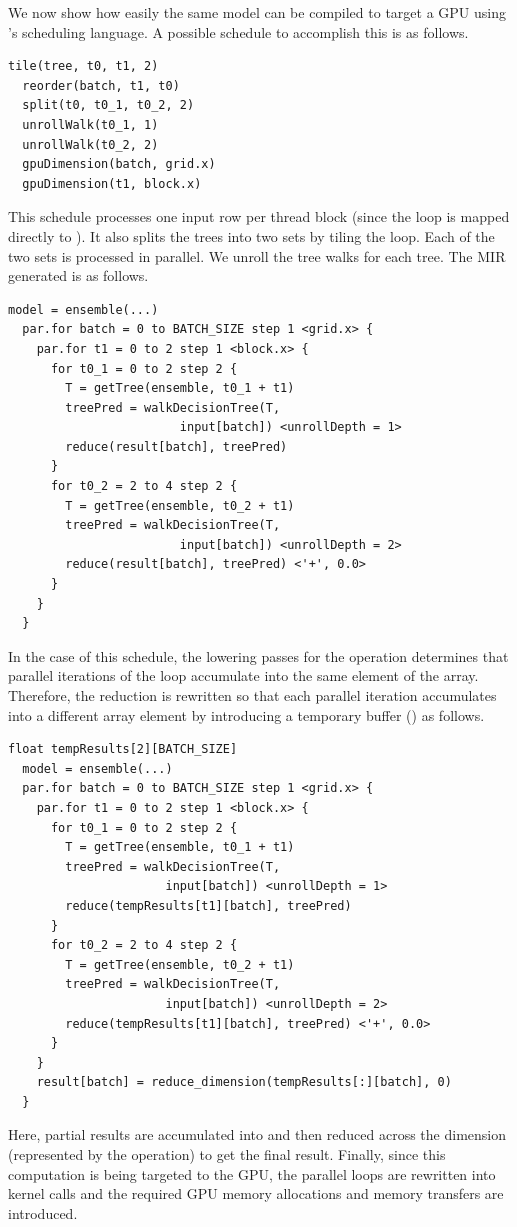 We now show how easily the same model can be compiled to target a GPU 
using \Treebeard{}'s scheduling language. 
A possible schedule to accomplish this is as follows.
\begin{lstlisting}[style=c++]
  tile(tree, t0, t1, 2)
  reorder(batch, t1, t0)
  split(t0, t0_1, t0_2, 2)
  unrollWalk(t0_1, 1)
  unrollWalk(t0_2, 2)
  gpuDimension(batch, grid.x)
  gpuDimension(t1, block.x)
\end{lstlisting}
This schedule processes one input row per thread block (since the 
loop is mapped directly to ).
It also splits the trees into two sets by tiling the  loop.
Each of the two sets is processed in parallel. We unroll the tree walks 
for each tree. The MIR generated is as follows. 
\begin{lstlisting}[style=c++]
  model = ensemble(...)
  par.for batch = 0 to BATCH_SIZE step 1 <grid.x> {
    par.for t1 = 0 to 2 step 1 <block.x> {
      for t0_1 = 0 to 2 step 2 {
        T = getTree(ensemble, t0_1 + t1)
        treePred = walkDecisionTree(T, 
                        input[batch]) <unrollDepth = 1>
        reduce(result[batch], treePred)
      }
      for t0_2 = 2 to 4 step 2 {
        T = getTree(ensemble, t0_2 + t1)
        treePred = walkDecisionTree(T,
                        input[batch]) <unrollDepth = 2>
        reduce(result[batch], treePred) <'+', 0.0>
      }
    }
  }
\end{lstlisting}

In the case of this schedule, the lowering passes for the 
operation determines that parallel iterations of the  
loop accumulate into the same element of the  array.
Therefore, the reduction is rewritten so that each parallel 
iteration accumulates into a different array element by introducing 
a temporary buffer () as follows.
\begin{lstlisting}[style=c++]
  float tempResults[2][BATCH_SIZE]
  model = ensemble(...)
  par.for batch = 0 to BATCH_SIZE step 1 <grid.x> {
    par.for t1 = 0 to 2 step 1 <block.x> {
      for t0_1 = 0 to 2 step 2 {
        T = getTree(ensemble, t0_1 + t1)
        treePred = walkDecisionTree(T, 
                      input[batch]) <unrollDepth = 1>
        reduce(tempResults[t1][batch], treePred)
      }
      for t0_2 = 2 to 4 step 2 {
        T = getTree(ensemble, t0_2 + t1)
        treePred = walkDecisionTree(T,
                      input[batch]) <unrollDepth = 2>
        reduce(tempResults[t1][batch], treePred) <'+', 0.0>
      }
    }
    result[batch] = reduce_dimension(tempResults[:][batch], 0)
  }
\end{lstlisting}
Here, partial results are accumulated into  and then
reduced across the  dimension (represented by the 
operation) to get the final result. Finally, since this computation is 
being targeted to the GPU, the parallel loops are rewritten into kernel calls 
and the required GPU memory allocations and memory transfers are introduced.

